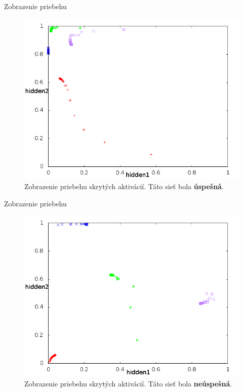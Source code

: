 \documentclass[xcolor=dvipsnames]{beamer}
\begin{document}
\begin{frame}{Zobrazenie priebehu}
  \begin{figure}[h!]  
    \centering
    \includegraphics[scale=0.4]{img/left_top.png}
    \caption{{\tiny Zobrazenie priebehu skrytých aktivácií. Táto sieť bola {\bf úspešná}.} }
  \end{figure} 
\end{frame}

\begin{frame}{Zobrazenie priebehu}
  \begin{figure}[h!]  
    \centering
    \includegraphics[scale=0.4]{img/tazisko.png}
    \caption{{\tiny Zobrazenie priebehu skrytých aktivácií. Táto sieť bola {\bf neúspešná}.} }
  \end{figure} 
\end{frame}
\end{document}
